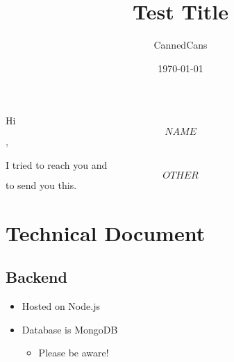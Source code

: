 \documentclass[11pt]{article}
\author{CannedCans}
\date{\today}
\title{Test Title}
\begin{document}
\maketitle
\tableofcontents

Hi $$NAME$$,

I tried to reach you and $$OTHER$$ to send you this.

\section{Technical Document}
\subsection{Backend}
\begin{itemize}
    \item Hosted on Node.js
    \item Database is MongoDB
    \begin{itemize}
        \item Please be aware!
    \end{itemize}
\end{itemize}
\end{document}
